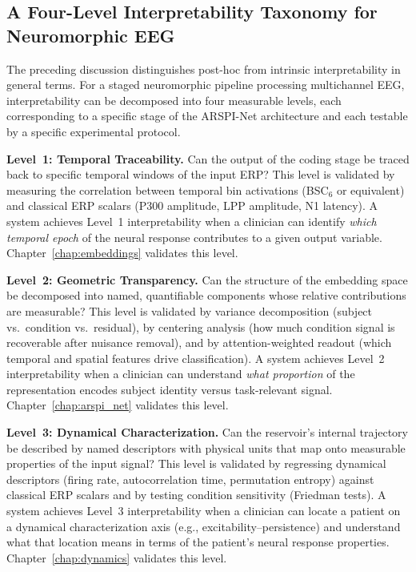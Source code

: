 \subsection{A Four-Level Interpretability Taxonomy for Neuromorphic EEG}
\label{sec:interp_taxonomy}

The preceding discussion distinguishes post-hoc from intrinsic interpretability in general terms. For a staged neuromorphic pipeline processing multichannel EEG, interpretability can be decomposed into four measurable levels, each corresponding to a specific stage of the ARSPI-Net architecture and each testable by a specific experimental protocol.

\textbf{Level~1: Temporal Traceability.} Can the output of the coding stage be traced back to specific temporal windows of the input ERP? This level is validated by measuring the correlation between temporal bin activations (BSC$_6$ or equivalent) and classical ERP scalars (P300 amplitude, LPP amplitude, N1 latency). A system achieves Level~1 interpretability when a clinician can identify \emph{which temporal epoch} of the neural response contributes to a given output variable. Chapter~\ref{chap:embeddings} validates this level.

\textbf{Level~2: Geometric Transparency.} Can the structure of the embedding space be decomposed into named, quantifiable components whose relative contributions are measurable? This level is validated by variance decomposition (subject vs.\ condition vs.\ residual), by centering analysis (how much condition signal is recoverable after nuisance removal), and by attention-weighted readout (which temporal and spatial features drive classification). A system achieves Level~2 interpretability when a clinician can understand \emph{what proportion} of the representation encodes subject identity versus task-relevant signal. Chapter~\ref{chap:arspi_net} validates this level.

\textbf{Level~3: Dynamical Characterization.} Can the reservoir's internal trajectory be described by named descriptors with physical units that map onto measurable properties of the input signal? This level is validated by regressing dynamical descriptors (firing rate, autocorrelation time, permutation entropy) against classical ERP scalars and by testing condition sensitivity (Friedman tests). A system achieves Level~3 interpretability when a clinician can locate a patient on a dynamical characterization axis (e.g., excitability--persistence) and understand what that location means in terms of the patient's neural response properties. Chapter~\ref{chap:dynamics} validates this level.


